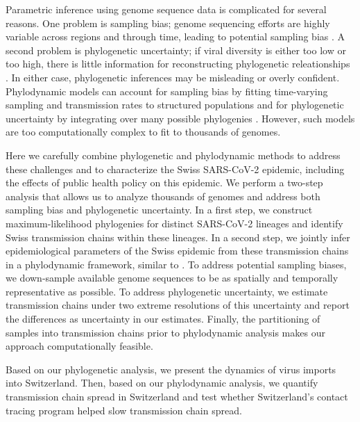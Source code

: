 \documentclass[9pt,twocolumn,twoside,lineno]{pnas-new}
\begin{document}
Parametric inference using genome sequence data is complicated for several reasons. One problem is sampling bias; genome sequencing efforts are highly variable across regions and through time, leading to potential sampling bias \cite{Villabona-Arenas2020, DeMaio2015}. A second problem is phylogenetic uncertainty; if viral diversity is either too low or too high, there is little information for reconstructing phylogenetic releationships  \cite{Villabona-Arenas2020}. In either case, phylogenetic inferences may be misleading or overly confident. Phylodynamic models can account for sampling bias by fitting  time-varying sampling and transmission rates to structured populations and for phylogenetic uncertainty by integrating over many possible phylogenies \cite{Scire2020b}. However, such models are too computationally complex to fit to thousands of genomes. 

Here we carefully combine phylogenetic and phylodynamic methods to address these challenges and to characterize the Swiss SARS-CoV-2 epidemic, including the effects of public health policy on this epidemic. We perform a two-step analysis that allows us to analyze thousands of genomes and address both sampling bias and phylogenetic uncertainty. In a first step, we construct maximum-likelihood phylogenies for distinct SARS-CoV-2 lineages and identify Swiss transmission chains within these lineages. In a second step, we jointly infer epidemiological parameters of the Swiss epidemic from these transmission chains in a phylodynamic framework, similar to \cite{Muller2020, Muller2020a}. To address potential sampling biases, we down-sample available genome sequences to be as spatially and temporally representative as possible. To address phylogenetic uncertainty, we estimate transmission chains under two extreme resolutions of this uncertainty and report the differences as uncertainty in our estimates. Finally, the partitioning of samples into transmission chains prior to phylodynamic analysis makes our approach computationally feasible.

Based on our phylogenetic analysis, we present the dynamics of virus imports into Switzerland. Then, based on our phylodynamic analysis, we quantify transmission chain spread in Switzerland and test whether Switzerland’s contact tracing program helped slow transmission chain spread.
\end{document}
